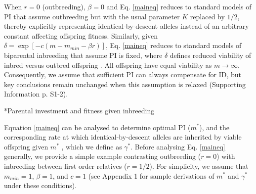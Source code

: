 \documentclass[12pt]{article}
\makeatletter
\renewcommand\subsection{\@startsection{subsection}{1}{-0.25in}{-0.5\baselineskip}{0.1\baselineskip}{\normalfont\normalsize\bfseries\textit}}
\makeatother
\begin{document}
When $r=0$ (outbreeding), $\beta=0$ and Eq. \ref{maineq} reduces to standard models of PI that assume outbreeding \cite[e.g.,][]{Macnair1978, Parker1978} but with the usual parameter $K$ replaced by $1/2$, thereby explicitly representing identical-by-descent alleles instead of an arbitrary constant affecting offspring fitness. Similarly, given $\delta = \exp\left[-c\left(m-m_{min}-\beta r\right)\right]$, Eq. \ref{maineq} reduces to standard models of biparental inbreeding that assume PI is fixed, where $\delta$ defines reduced viability of inbred versus outbred offspring \cite[see][]{Kokko2006, Parker2006, Duthie2015a}.  All offspring have equal viability as $m \to \infty$. Consequently, we assume that sufficient PI can always compensate for ID, but key conclusions remain unchanged when this assumption is relaxed (Supporting Information p. S1-2).

\subsection*{Parental investment and fitness given inbreeding}

Equation \ref{maineq} can be analysed to determine optimal PI ($m^{*}$), and the corresponding rate at which identical-by-descent alleles are inherited by viable offspring given $m^{*}$ \cite[][]{Kuijper2012}, which we define as $\gamma^{*}$. Before analysing Eq. \ref{maineq} generally, we provide a simple example contrasting outbreeding ($r=0$) with inbreeding between first order relatives ($r=1/2$). For simplicity, we assume that $m_{min}=1$, $\beta=1$, and $c=1$ (see Appendix 1 for sample derivations of $m^{*}$ and $\gamma^{*}$ under these conditions). 
\end{document}
